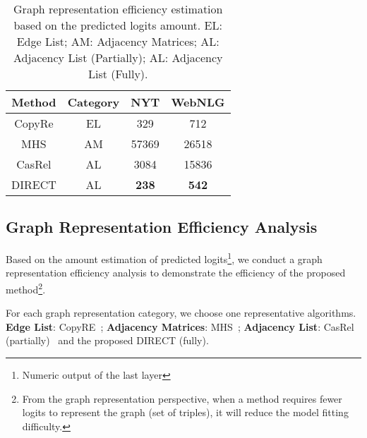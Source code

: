 \documentclass[11pt,a4paper]{article}
\begin{document}
\begin{table}[htbp]
\centering
\begin{tabular}{c|c|cc}
\toprule[1pt]
Method & Category  & NYT & WebNLG\\
\hline
CopyRe & EL &  329 & 712 \\
MHS & AM  & 57369 & 26518 \\
CasRel & AL & 3084 & 15836 \\
\hline
DIRECT& AL &  \textbf{238} & \textbf{542} \\
\bottomrule[1pt]
\end{tabular}
\caption{Graph representation efficiency estimation based on the predicted logits amount. EL: Edge List; AM: Adjacency Matrices; AL: Adjacency List (Partially); AL: Adjacency List (Fully).}
\label{tab:logit1}
\end{table}

\subsection{Graph Representation Efficiency Analysis}\label{sec:computation}
Based on the amount estimation of predicted logits\footnote{Numeric output  of the last layer}, we conduct a graph representation efficiency analysis to demonstrate the efficiency of the proposed method\footnote{From the graph representation perspective, when a method requires fewer logits to represent the graph (set of triples), it will reduce the model fitting difficulty.}.

For each graph representation category, we choose one representative  algorithms. \textbf{Edge List}: CopyRE~\cite{zeng2018extracting}; \textbf{Adjacency Matrices}: MHS~\cite{bekoulis2018joint}; \textbf{Adjacency List}: CasRel (partially)~\cite{wei2020novel} and the proposed DIRECT (fully).
\end{document}
